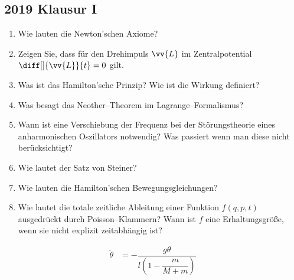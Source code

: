 \documentclass[a4paper,12pt]{article}
\numberwithin{equation}{section}
\begin{document}
\newpage
\subsection{2019 Klausur I}
\begin{enumerate}[label=\arabic*.]
        \item Wie lauten die Newton'schen Axiome?
        \item Zeigen Sie, dass für den Drehimpuls $\vv{L}$ im Zentralpotential $\diff[]{\vv{L}}{t}=0$ gilt.
        \item Was ist das Hamilton'sche Prinzip? Wie ist die Wirkung definiert?
        \item Was besagt das Neother--Theorem im Lagrange--Formalismus?
        \item Wann ist eine Verschiebung der Frequenz bei der Störungstheorie eines anharmonischen Oszillators notwendig? Was passiert wenn man diese nicht berücksichtigt?
        \item Wie lautet der Satz von Steiner?
        \item Wie lauten die Hamilton'schen Bewegungsgleichungen?
        \item Wie lautet die totale zeitliche Ableitung einer Funktion $f\left(q,p,t\right)$ ausgedrückt durch Poisson--Klammern? Wann ist $f$ eine Erhaltungsgröße, wenn sie nicht explizit zeitabhängig ist?
\end{enumerate}

\newpage

\begin{align} 
        \ddot{\theta }&=-\dfrac{g\theta }{l\left(1-\dfrac{m}{M+m}\right)}
\end{align} 


\end{document}
